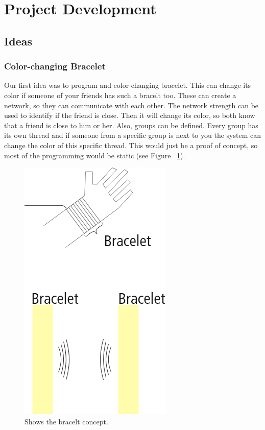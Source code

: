 \documentclass[doc.tex]{subfiles}
\begin{document}
    \section{Project Development}
    \subsection{Ideas}
    \subsubsection{Color-changing Bracelet}
    \begin{flushleft}
        Our first idea was to program and color-changing bracelet. This can change its color if someone of your
        friends has such a bracelt too. These can create a network, so they can communicate with each other. The
        network strength can be used to identify if the friend is close. Then it will change its color, so both know
        that a friend is close to him or her. Also, groups can be defined. Every group has its own thread and if someone 
        from a specific group is next to you the system can change the color of this specific thread. This would just 
        be a proof of concept, so most of the programming would be static (see Figure ~\ref{fig:braceltIdea}).
    \end{flushleft}

    \begin{figure}[h!]
        \centering
        \includegraphics[scale=0.4]{images/projectideas/bracelt.png}
        \caption{Shows the bracelt concept.}
        \label{fig:braceltIdea}
    \end{figure}
\end{document}
